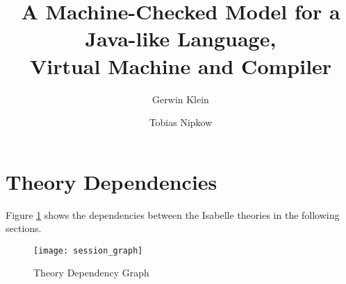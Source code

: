 \documentclass[11pt,a4paper]{book}
\begin{document}
\title{A Machine-Checked Model for a Java-like Language,\\
       Virtual Machine and Compiler}
\author{Gerwin Klein \and Tobias Nipkow}
\maketitle


\tableofcontents



\section{Theory Dependencies}

Figure \ref{theory-deps} shows the dependencies between 
the Isabelle theories in the following sections.

\begin{figure}[h!t]
\begin{center}
  \texttt{[image: session\_graph]}
\end{center}
\caption{Theory Dependency Graph\label{theory-deps}}
\end{figure}

\newpage


\newpage
\nocite{*}


\end{document}
